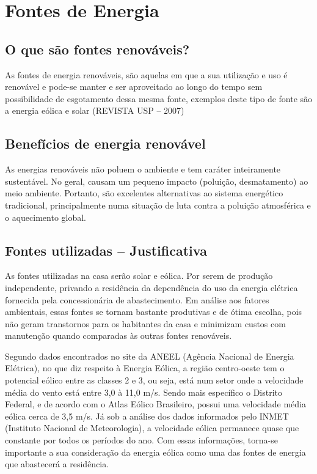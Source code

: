 \section{Fontes de Energia}

\subsection{O que são fontes renováveis?}

	As fontes de energia renováveis, são aquelas em que a sua utilização e uso é renovável e pode-se manter e ser aproveitado ao longo do tempo sem possibilidade de esgotamento dessa mesma fonte, exemplos deste tipo de fonte são a energia eólica e solar (REVISTA USP – 2007)

\subsection{Benefícios de energia renovável}

	As energias renováveis não poluem o ambiente e tem caráter inteiramente sustentável. No geral, causam um pequeno impacto (poluição, desmatamento) ao meio ambiente. Portanto, são excelentes alternativas ao sistema energético tradicional, principalmente numa situação de luta contra a poluição atmosférica e o aquecimento global.

\subsection{Fontes utilizadas -- Justificativa}

	As fontes utilizadas na casa serão solar e eólica. Por serem de produção independente, privando a residência da dependência do uso da energia elétrica fornecida pela concessionária de abastecimento. Em análise aos fatores ambientais, essas fontes se tornam bastante produtivas e de ótima escolha, pois não geram transtornos para os habitantes da casa e minimizam custos com manutenção quando comparadas às outras fontes renováveis.

	Segundo dados encontrados no site da ANEEL (Agência Nacional de Energia Elétrica), no que diz respeito à Energia Eólica, a região centro-oeste tem o potencial eólico entre as classes 2 e 3, ou seja, está num setor onde a velocidade média do vento está entre 3,0 à 11,0 m/s. Sendo mais específico o Distrito Federal, e de acordo com o Atlas Eólico Brasileiro, possui uma velocidade média eólica cerca de 3,5 m/s. Já sob a análise dos dados informados pelo INMET (Instituto Nacional de Meteorologia), a velocidade eólica permanece quase que constante por todos os períodos do ano. Com essas informações, torna-se importante a sua consideração da energia eólica como uma das fontes de energia que abastecerá a residência.

